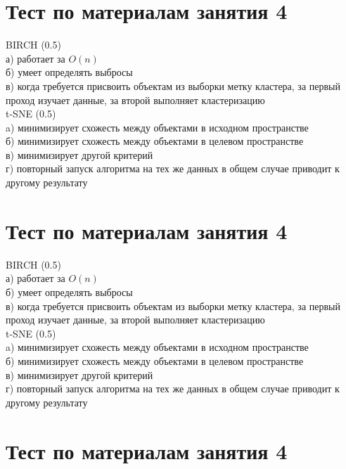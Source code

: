 \documentclass[10pt,a4paper]{article}
\author{Nikolay Anokhin}
\begin{document}
\thispagestyle{empty}

\section*{Тест по материалам занятия 4}

BIRCH (0.5) \\
а) работает за $O(n)$ \\
б) умеет определять выбросы \\
в) когда требуется присвоить объектам из выборки метку кластера, за первый проход изучает данные, за второй выполняет кластеризацию \\

\noindent t-SNE (0.5) \\
a) минимизирует схожесть между объектами в исходном пространстве \\
б) минимизирует схожесть между объектами в целевом пространстве \\
в) минимизирует другой критерий \\
г) повторный запуск алгоритма на тех же данных в общем случае приводит к другому результату \\

\section*{Тест по материалам занятия 4}

BIRCH (0.5) \\
а) работает за $O(n)$ \\
б) умеет определять выбросы \\
в) когда требуется присвоить объектам из выборки метку кластера, за первый проход изучает данные, за второй выполняет кластеризацию \\

\noindent t-SNE (0.5) \\
a) минимизирует схожесть между объектами в исходном пространстве \\
б) минимизирует схожесть между объектами в целевом пространстве \\
в) минимизирует другой критерий \\
г) повторный запуск алгоритма на тех же данных в общем случае приводит к другому результату \\

\section*{Тест по материалам занятия 4}
\end{document}
